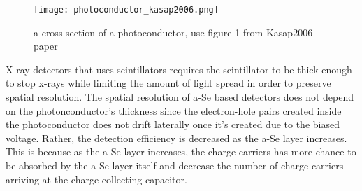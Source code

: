 \begin{figure}
\centering
\texttt{[image: photoconductor\_kasap2006.png]}
\caption{a cross section of a photoconductor, use figure 1 from Kasap2006 paper}
\label{fig:photoconductor_cross_section}
\end{figure} 


X-ray detectors that uses scintillators requires the scintillator to be thick enough to stop x-rays while limiting the amount of light spread in order to preserve spatial resolution.  The spatial resolution of a-Se based detectors does not depend on the photonconductor's thickness since the electron-hole pairs created inside the photoconductor does not drift laterally once it's created due to the biased voltage.  Rather, the detection efficiency is decreased as the a-Se layer increases.  This is because as the a-Se layer increases,  the charge carriers has more chance to be absorbed by the a-Se layer itself and decrease the number of charge carriers arriving at the charge collecting capacitor.

